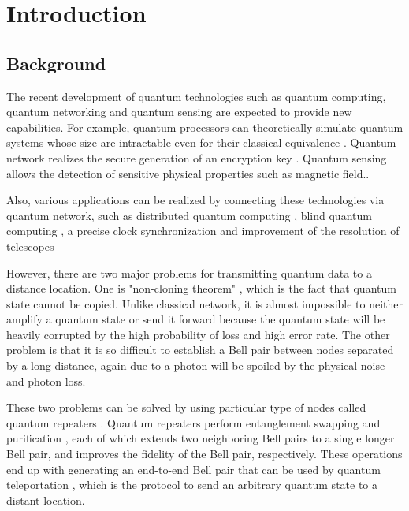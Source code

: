 \chapter{Introduction}
\label{introduction}

\section{Background}
\label{introduction:background} 

The recent development of quantum technologies such as quantum computing, quantum networking and quantum sensing are expected to provide new capabilities. 
For example, quantum processors can theoretically simulate quantum systems whose size are intractable even for their classical equivalence \cite{feynman1982simulating}.
Quantum network realizes the secure generation of an encryption key \cite{Bennett_2014} \cite{PhysRevLett.67.661}.
Quantum sensing allows the detection of sensitive physical properties such as magnetic field.\cite{pmid:12686995}.

Also, various applications can be realized by connecting these technologies via quantum network, such as distributed quantum computing \cite{Meter2016ThePT}, blind quantum computing \cite{arrighi2006blind}, a precise clock synchronization \cite{jozsa2000quantum} and improvement of the resolution of telescopes \cite{PhysRevLett.123.070504}

However, there are two major problems for transmitting quantum data to a distance location.
One is "non-cloning theorem" \cite{wootters1982single}, which is the fact that quantum state cannot be copied. Unlike classical network, it is almost impossible to neither amplify a quantum state or send it forward because the quantum state will be heavily corrupted by the high probability of loss and high error rate.
The other problem is that it is so difficult to establish a Bell pair between nodes separated by a long distance, again due to a photon will be spoiled by the physical noise and photon loss.

These two problems can be solved by using particular type of nodes called quantum repeaters \cite{PhysRevLett.81.5932}. Quantum repeaters perform entanglement swapping \cite{zukowski1993event} and purification \cite{PhysRevA.53.2046}, each of which extends two neighboring Bell pairs to a single longer Bell pair, and improves the fidelity of the Bell pair, respectively.
These operations end up with generating an end-to-end Bell pair that can be used by quantum teleportation \cite{PhysRevLett.70.1895}, which is the protocol to send an arbitrary quantum state to a distant location. 

